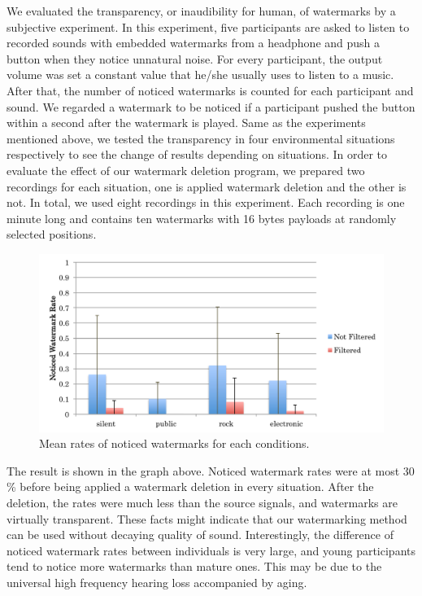 We evaluated the transparency, or inaudibility for human, of watermarks by a subjective experiment.
In this experiment, five participants are asked to listen to recorded sounds with embedded watermarks from a headphone and push a button when they notice unnatural noise.
For every participant, the output volume was set a constant value that he/she usually uses to listen to a music.
After that, the number of noticed watermarks is counted for each participant and sound.
We regarded a watermark to be noticed if a participant pushed the button within a second after the watermark is played.
Same as the experiments mentioned above, we tested the transparency in four environmental situations respectively to see the change of results depending on situations.
In order to evaluate the effect of our watermark deletion program, we prepared two recordings for each situation, one is applied watermark deletion and the other is not.
In total, we used eight recordings in this experiment.
Each recording is one minute long and contains ten watermarks with 16 bytes payloads at randomly selected positions.

\begin{figure}[htbp]
 \begin{center}
  \includegraphics[width=120mm]{evaluation_transparency.pdf}
 \end{center}
 \caption{Mean rates of noticed watermarks for each conditions.}
 \label{fig:eval_tran}
\end{figure}

The result is shown in the graph above.
Noticed watermark rates were at most 30 \% before being applied a watermark deletion in every situation.
After the deletion, the rates were much less than the source signals, and watermarks are virtually transparent.
These facts might indicate that our watermarking method can be used without decaying quality of sound.
Interestingly, the difference of noticed watermark rates between individuals is very large, and young participants tend to notice more watermarks than mature ones.
This may be due to the universal high frequency hearing loss accompanied by aging.